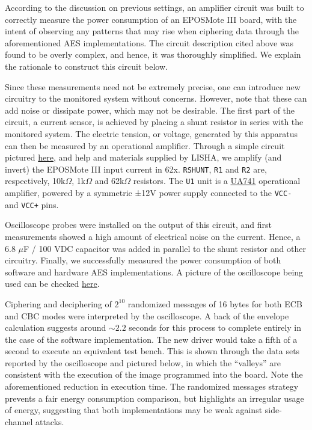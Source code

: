 \documentclass{../sftex/sftex}
\begin{document}
According to the discussion on previous settings, an amplifier circuit was
built to correctly measure the power consumption of an EPOSMote III board, with
the intent of observing any patterns that may rise when ciphering data through
the aforementioned AES implementations. The circuit description cited above was
found to be overly complex, and hence, it was thoroughly simplified. We explain
the rationale to construct this circuit below.

Since these measurements need not be extremely precise, one can introduce new
circuitry to the monitored system without concerns. However, note that these
can add noise or dissipate power, which may not be desirable. The first part of
the circuit, a current sensor, is achieved by placing a shunt resistor in
series with the monitored system. The electric tension, or voltage, generated
by this apparatus can then be measured by an operational amplifier. Through a
simple circuit pictured \href{https://epos.lisha.ufsc.br/dl821?display}{here},
and help and materials supplied by LISHA, we amplify (and invert) the EPOSMote
III input current in 62x. \verb!RSHUNT!, \verb!R1!  and \verb!R2! are,
respectively, 10k$\Omega$, 1k$\Omega$ and 62k$\Omega$ resistors. The \verb!U1!
unit is a \href{http://www.ti.com/product/UA741}{UA741} operational amplifier,
powered by a symmetric ±12V power supply connected to the \verb!VCC-! and
\verb!VCC+! pins.

Oscilloscope probes were installed on the output of this circuit, and first
measurements showed a high amount of electrical noise on the current. Hence, a
6.8 $\mu$F / 100 VDC capacitor was added in parallel to the shunt resistor and
other circuitry. Finally, we successfully measured the power consumption of
both software and hardware AES implementations. A picture of the oscilloscope
being used can be checked
\href{https://epos.lisha.ufsc.br/dl824?display}{here}.

Ciphering and deciphering of $2^{10}$ randomized messages of 16 bytes for both
ECB and CBC modes were interpreted by the oscilloscope. A back of the envelope
calculation suggests around $\sim 2.2$ seconds for this process to complete
entirely in the case of the software implementation. The new driver would take
a fifth of a second to execute an equivalent test bench. This is shown through
the data sets reported by the oscilloscope and pictured below, in which the
``valleys'' are consistent with the execution of the image programmed into the
board. Note the aforementioned reduction in execution time. The randomized
messages strategy prevents a fair energy consumption comparison, but highlights
an irregular usage of energy, suggesting that both implementations may be weak
against side-channel attacks.
\end{document}
